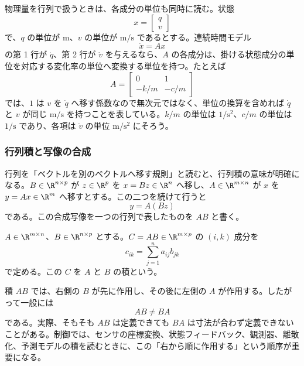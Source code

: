 物理量を行列で扱うときは、各成分の単位も同時に読む。状態
\begin{equation}
  x=\begin{bmatrix}q\\v\end{bmatrix}
\end{equation}
で、$q$ の単位が m、$v$ の単位が $\mathrm{m/s}$ であるとする。連続時間モデル
\begin{equation}
  \dot{x}=Ax
\end{equation}
の第 1 行が $\dot{q}$、第 2 行が $\dot{v}$ を与えるなら、$A$ の各成分は、掛ける状態成分の単位を対応する変化率の単位へ変換する単位を持つ。たとえば
\begin{equation}
  A=
  \begin{bmatrix}
    0&1\\
    -k/m&-c/m
  \end{bmatrix}
\end{equation}
では、$1$ は $v$ を $\dot{q}$ へ移す係数なので無次元ではなく、単位の換算を含めれば $\dot{q}$ と $v$ が同じ $\mathrm{m/s}$ を持つことを表している。$k/m$ の単位は $1/\mathrm{s^2}$、$c/m$ の単位は $1/\mathrm{s}$ であり、各項は $\dot{v}$ の単位 $\mathrm{m/s^2}$ にそろう。

\subsubsection{行列積と写像の合成}

行列を「ベクトルを別のベクトルへ移す規則」と読むと、行列積の意味が明確になる。$B\in\R^{n\times p}$ が $z\in\R^p$ を $x=Bz\in\R^n$ へ移し、$A\in\R^{m\times n}$ が $x$ を $y=Ax\in\R^m$ へ移すとする。この二つを続けて行うと
\begin{equation}
  y=A(Bz)
\end{equation}
である。この合成写像を一つの行列で表したものを $AB$ と書く。

\begin{definition}[行列積]
$A\in\R^{m\times n}$、$B\in\R^{n\times p}$ とする。$C=AB\in\R^{m\times p}$ の $(i,k)$ 成分を
\begin{equation}
  c_{ik}=
  \sum_{j=1}^{n}a_{ij}b_{jk}
\end{equation}
で定める。この $C$ を $A$ と $B$ の積という。
\end{definition}

積 $AB$ では、右側の $B$ が先に作用し、その後に左側の $A$ が作用する。したがって一般には
\begin{equation}
  AB\ne BA
\end{equation}
である。実際、そもそも $AB$ は定義できても $BA$ は寸法が合わず定義できないことがある。制御では、センサの座標変換、状態フィードバック、観測器、離散化、予測モデルの積を読むときに、この「右から順に作用する」という順序が重要になる。

